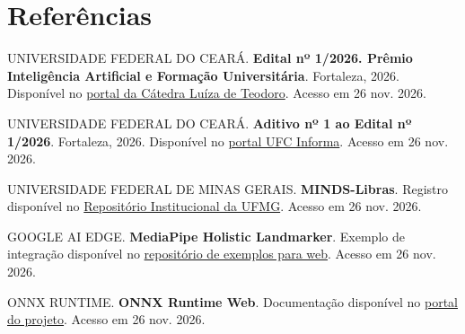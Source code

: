 \documentclass[12pt,a4paper]{article}
\begin{document}
\section*{Referências}

UNIVERSIDADE FEDERAL DO CEARÁ. \textbf{Edital nº 1/2026. Prêmio Inteligência Artificial e Formação Universitária}. Fortaleza, 2026. Disponível no \href{https://catedraldt.virtual.ufc.br/wp-content/uploads/2026/11/edital-premio-catedra-ia-2026.pdf}{portal da Cátedra Luíza de Teodoro}. Acesso em 26 nov. 2026.

UNIVERSIDADE FEDERAL DO CEARÁ. \textbf{Aditivo nº 1 ao Edital nº 1/2026}. Fortaleza, 2026. Disponível no \href{https://ufcinforma.ufc.br/storage/ufc-media/docs/doc-261105-aditivo-premio-catedra-luiza-teodoro.pdf}{portal UFC Informa}. Acesso em 26 nov. 2026.

UNIVERSIDADE FEDERAL DE MINAS GERAIS. \textbf{MINDS-Libras}. Registro disponível no \href{https://repositorio.ufmg.br/items/b4a21355-8b2d-445f-a610-d95f07e28b2a}{Repositório Institucional da UFMG}. Acesso em 26 nov. 2026.

GOOGLE AI EDGE. \textbf{MediaPipe Holistic Landmarker}. Exemplo de integração disponível no \href{https://github.com/google-ai-edge/mediapipe-samples-web/blob/main/src/workers/holistic-landmarker.worker.ts}{repositório de exemplos para web}. Acesso em 26 nov. 2026.

ONNX RUNTIME. \textbf{ONNX Runtime Web}. Documentação disponível no \href{https://onnxruntime.ai/docs/tutorials/web/}{portal do projeto}. Acesso em 26 nov. 2026.
\end{document}
